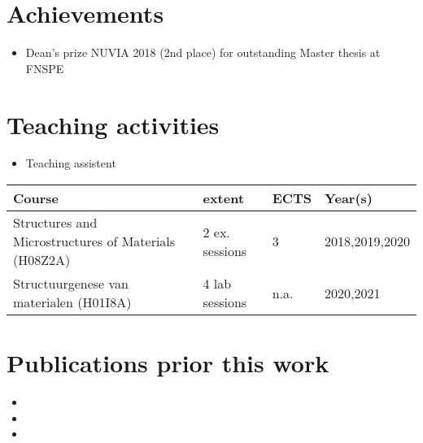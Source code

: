 \section*{Achievements}
\begin{itemize}
	\item Dean's prize NUVIA 2018 (2nd place) for outstanding Master thesis at FNSPE
\end{itemize}

\section*{Teaching activities}
\begin{itemize}
	\item Teaching assistent \\
\end{itemize}
\begin{tabular}{p{5.5cm}|l|l|l}
	Course           & extent & ECTS & Year(s) \\ \hline
	Structures and Microstructures of Materials (H08Z2A)  & 2 ex. sessions & 3 &  2018,2019,2020       \\
	Structuurgenese van materialen (H01I8A)	 & 4 lab sessions	& n.a.	& 2020,2021
\end{tabular}


\section*{Publications prior this work}
\begin{itemize}
	\item {}
	\item {}
	\item {}
\end{itemize}


\cleardoublepage

